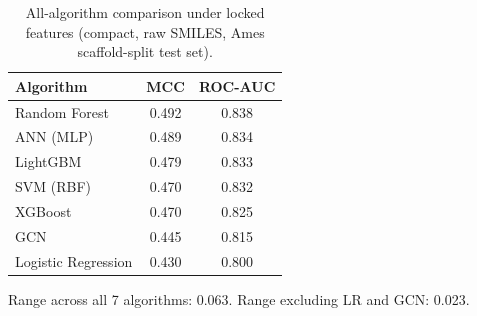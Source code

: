 \begin{table}[ht]
\caption{All-algorithm comparison under locked features (compact, raw SMILES, Ames scaffold-split test set).}
\label{tab:all_algorithms}
\centering
\small
\begin{tabular}{@{}lcc@{}}
\toprule
Algorithm & MCC & ROC-AUC \\
\midrule
Random Forest & 0.492 & 0.838 \\
ANN (MLP) & 0.489 & 0.834 \\
LightGBM & 0.479 & 0.833 \\
SVM (RBF) & 0.470 & 0.832 \\
XGBoost & 0.470 & 0.825 \\
GCN & 0.445 & 0.815 \\
Logistic Regression & 0.430 & 0.800 \\
\bottomrule
\end{tabular}

\medskip
\footnotesize
Range across all 7 algorithms: 0.063. Range excluding LR and GCN: 0.023.
\end{table}
